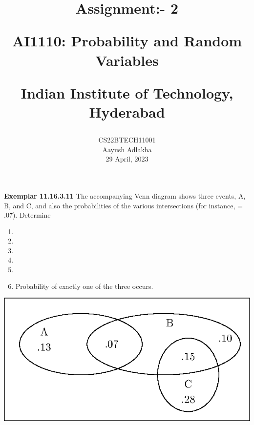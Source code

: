 \documentclass[journal,12pt,twocolumn]{IEEEtran}
\begin{document}
\let\vec\mathbf


\vspace{3cm}

\title{
	Assignment:- 2
 
	\Large AI1110: Probability and Random Variables
 
	\Large Indian Institute of Technology, Hyderabad
}
\author{
	CS22BTECH11001
	
	Aayush Adlakha
 
	29 April, 2023
}






\maketitle

\newpage


\bigskip
\renewcommand{\thefigure}{\theenumi}
\renewcommand{\thetable}{\theenumi}
\textbf{Exemplar 11.16.3.11}
The accompanying Venn diagram shows three events, A, B, and C, and also the probabilities of the various intersections (for instance,  = .07). Determine
\begin{enumerate}[label=(\alph*)]
\item 
{}
\item 
{}
\item 
{}
\item 
{}
\item 
{}
\item 
Probability of exactly one
of the three occurs.
\end{enumerate}
\includegraphics[scale=1]{Figures/new-figure0}
\end{document}
